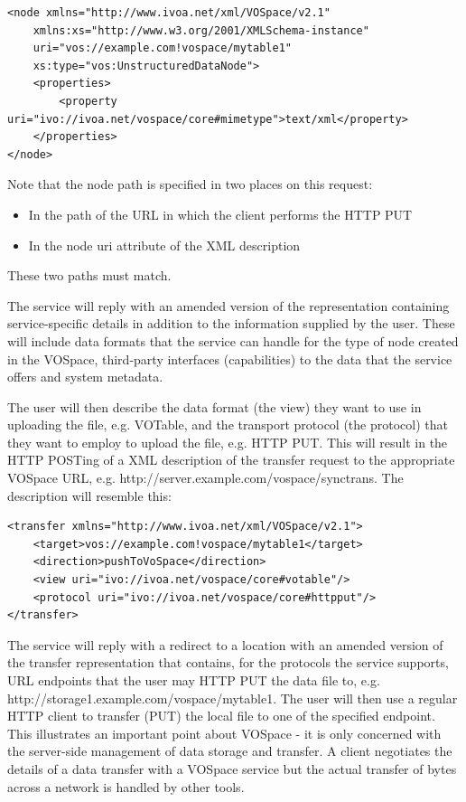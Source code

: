 \documentclass[11pt,a4paper]{ivoa}
\begin{document}
\begin{lstlisting}
<node xmlns="http://www.ivoa.net/xml/VOSpace/v2.1"
    xmlns:xs="http://www.w3.org/2001/XMLSchema-instance" 
    uri="vos://example.com!vospace/mytable1"
    xs:type="vos:UnstructuredDataNode">  
    <properties> 
        <property uri="ivo://ivoa.net/vospace/core#mimetype">text/xml</property>     
    </properties> 
</node> 
\end{lstlisting}

Note that the node path is specified in two places on this request:
\begin{itemize}
   \item In the path of the URL in which the client performs the HTTP PUT
   \item In the node uri attribute of the XML description
\end{itemize}
These two paths must match.

The service will reply with an amended version of the representation containing service-specific details in addition to the information supplied by the user. These will include data formats that the service can handle for the type of node created in the VOSpace, third-party interfaces (capabilities) to the data that the service offers and system metadata.

The user will then describe the data format (the view) they want to use in uploading the file, e.g. VOTable, and the transport protocol (the protocol) that they want to employ to upload the file, e.g. HTTP PUT. This will result in the HTTP POSTing of a XML description of the transfer request to the appropriate VOSpace URL, e.g. http://server.example.com/vospace/synctrans. The description will resemble this:

\begin{lstlisting}
<transfer xmlns="http://www.ivoa.net/xml/VOSpace/v2.1">
    <target>vos://example.com!vospace/mytable1</target>
    <direction>pushToVoSpace</direction> 
    <view uri="ivo://ivoa.net/vospace/core#votable"/> 
    <protocol uri="ivo://ivoa.net/vospace/core#httpput"/>  
</transfer>
\end{lstlisting}

The service will reply with a redirect to a location with an amended version of the transfer representation that contains, for the protocols the service supports, URL endpoints that the user may HTTP PUT the data file to, e.g. http://storage1.example.com/vospace/mytable1.  The user will then use a regular HTTP client to transfer (PUT) the local file to one of the specified endpoint. This illustrates an important point about VOSpace - it is only concerned with the server-side management of data storage and transfer. A client negotiates the details of a data transfer with a VOSpace service but the actual transfer of bytes across a network is handled by other tools.
\end{document}
